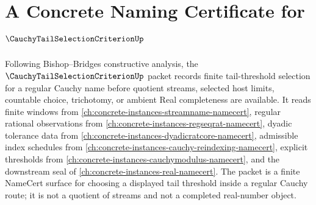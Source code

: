 \chapter{A Concrete Naming Certificate for $\CauchyTailSelectionCriterionUp$}
\label{ch:concrete-instances-cauchy-tail-selection-criterion-namecert}

Following Bishop--Bridges constructive analysis, the $\CauchyTailSelectionCriterionUp$ packet records finite tail-threshold selection for a regular Cauchy name before quotient streams, selected host limits, countable choice, trichotomy, or ambient Real completeness are available. It reads finite windows from \autoref{ch:concrete-instances-streamname-namecert}, regular rational observations from \autoref{ch:concrete-instances-regseqrat-namecert}, dyadic tolerance data from \autoref{ch:concrete-instances-dyadicratcore-namecert}, admissible index schedules from \autoref{ch:concrete-instances-cauchy-reindexing-namecert}, explicit thresholds from \autoref{ch:concrete-instances-cauchymodulus-namecert}, and the downstream seal of \autoref{ch:concrete-instances-real-namecert}. The packet is a finite NameCert surface for choosing a displayed tail threshold inside a regular Cauchy route; it is not a quotient of streams and not a completed real-number object.


